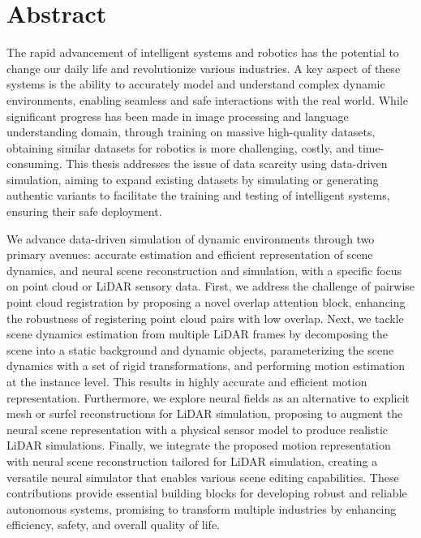
\chapter*{Abstract}
\label{chap:abstract}
The rapid advancement of intelligent systems and robotics has the potential to change our daily life and revolutionize various industries. A key aspect of these systems is the ability to accurately model and understand complex dynamic environments, enabling seamless and safe interactions with the real world. While significant progress has been made in image processing and language understanding domain, through training on massive high-quality datasets, obtaining similar datasets for robotics is more challenging, costly, and time-consuming. This thesis addresses the issue of data scarcity using data-driven simulation, aiming to expand existing datasets by simulating or generating authentic variants to facilitate the training and testing of intelligent systems, ensuring their safe deployment.

We advance data-driven simulation of dynamic environments through two primary avenues: accurate estimation and efficient representation of scene dynamics, and neural scene reconstruction and simulation, with a specific focus on point cloud or LiDAR sensory data. First, we address the challenge of pairwise point cloud registration by proposing a novel overlap attention block, enhancing the robustness of registering point cloud pairs with low overlap. Next, we tackle scene dynamics estimation from multiple LiDAR frames by decomposing the scene into a static background and dynamic objects, parameterizing the scene dynamics with a set of rigid transformations, and performing motion estimation at the instance level. This results in highly accurate and efficient motion representation. Furthermore, we explore neural fields as an alternative to explicit mesh or surfel reconstructions for LiDAR simulation, proposing to augment the neural scene representation with a physical sensor model to produce realistic LiDAR simulations. Finally, we integrate the proposed motion representation with neural scene reconstruction tailored for LiDAR simulation, creating a versatile neural simulator that enables various scene editing capabilities. These contributions provide essential building blocks for developing robust and reliable autonomous systems, promising to transform multiple industries by enhancing efficiency, safety, and overall quality of life.


